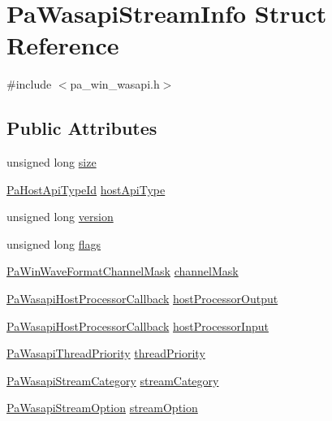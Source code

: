 \hypertarget{struct_pa_wasapi_stream_info}{}\section{Pa\+Wasapi\+Stream\+Info Struct Reference}
\label{struct_pa_wasapi_stream_info}


{\ttfamily \#include $<$pa\+\_\+win\+\_\+wasapi.\+h$>$}

\subsection*{Public Attributes}
\begin{DoxyCompactItemize}
\item 
unsigned long \hyperlink{struct_pa_wasapi_stream_info_ae491f41ce5954cddd438624dc69eba1b}{size}
\item 
\hyperlink{portaudio_8h_a8eaebe3d39c5ea45598da8f86dc2e5ae}{Pa\+Host\+Api\+Type\+Id} \hyperlink{struct_pa_wasapi_stream_info_a931bf93691d5b36b621d49402d1d2255}{host\+Api\+Type}
\item 
unsigned long \hyperlink{struct_pa_wasapi_stream_info_a3045f4432a92d761e4a1b95eba97ae49}{version}
\item 
unsigned long \hyperlink{struct_pa_wasapi_stream_info_a85bfbe1a00e6b48df75528eb6f967a2c}{flags}
\item 
\hyperlink{pa__win__waveformat_8h_ad7a5a909f82e3f45d4c690d09d53a3f4}{Pa\+Win\+Wave\+Format\+Channel\+Mask} \hyperlink{struct_pa_wasapi_stream_info_a3e893ff6c6f81fb7171ac325136a7dd1}{channel\+Mask}
\item 
\hyperlink{pa__win__wasapi_8h_ae3d91dd8eaeff3cbe9ff3bfafc5e6006}{Pa\+Wasapi\+Host\+Processor\+Callback} \hyperlink{struct_pa_wasapi_stream_info_a300576059815d6ab77af37f708f818ac}{host\+Processor\+Output}
\item 
\hyperlink{pa__win__wasapi_8h_ae3d91dd8eaeff3cbe9ff3bfafc5e6006}{Pa\+Wasapi\+Host\+Processor\+Callback} \hyperlink{struct_pa_wasapi_stream_info_a0cb8bd209c8b453e9d1d08909e63ac38}{host\+Processor\+Input}
\item 
\hyperlink{pa__win__wasapi_8h_a561291b0188f6f29246ea669b48e2661}{Pa\+Wasapi\+Thread\+Priority} \hyperlink{struct_pa_wasapi_stream_info_a81ed024aceceb79e593aa4f1ec28594a}{thread\+Priority}
\item 
\hyperlink{pa__win__wasapi_8h_ad97a45cc69a868e307e1111e715e6d20}{Pa\+Wasapi\+Stream\+Category} \hyperlink{struct_pa_wasapi_stream_info_a4a85848eaa76d85d0d305060b094d76a}{stream\+Category}
\item 
\hyperlink{pa__win__wasapi_8h_a5ae8d22b8699b82f6ee63d195f8c857f}{Pa\+Wasapi\+Stream\+Option} \hyperlink{struct_pa_wasapi_stream_info_a9ecd3ca932f2de23d1e1991f6ab3b580}{stream\+Option}
\end{DoxyCompactItemize}



